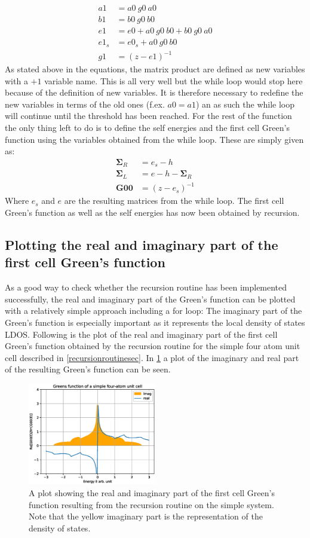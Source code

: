 \begin{align*}
a1 &= a0\ g0\ a0\\
b1 &= b0\ g0\ b0\\
e1 &= e0 + a0\ g0\ b0 + b0\ g0\ a0 \\
e1_{s} &= e0_{s} + a0\ g0\ b0 \\
g1 &= (z - e1)^{-1}
\end{align*}
As stated above in the equations, the matrix product are defined as new variables with a \(+1\) variable name. This is all very well but the while loop would stop here because of the definition of new variables. It is therefore necessary to redefine the new variables in terms of the old ones (f.ex. \(a0 = a1\)) an as such the while loop will continue until the threshold has been reached. For the rest of the function the only thing left to do is to define the self energies and the first cell Green's function using the variables obtained from the while loop. These are simply given as: 
\begin{align*}\label{\outputs}
    \mathbf{\Sigma}_R &= e_s - h \\
    \mathbf{\Sigma}_L &= e - h - \mathbf{\Sigma}_R \\
    \mathbf{G00} &= (z - e_s)^{-1}
\end{align*}
Where \(e_s\) and \(e\) are the resulting matrices from the while loop. The first cell Green's function as well as the self energies has now been obtained by recursion. 
\subsection{Plotting the real and imaginary part of the first cell Green's function}
As a good way to check whether the recursion routine has been implemented successfully, the real and imaginary part of the Green's function can be plotted with a relatively simple approach including a for loop:
The imaginary part of the Green's function is especially important as it represents the local density of states LDOS. Following is the plot of the real and imaginary part of the first cell Green's function obtained by the recursion routine for the simple four atom unit cell described in \cref{recursionroutinesec}. In \cref{imrealplot} a plot of the imaginary and real part of the resulting Green's function can be seen. 
\begin{figure}
    \centering
    \includegraphics[width = 0.5\textwidth]{Figures/imrealplot.eps}
    \caption{A plot showing the real and imaginary part of the first cell Green's function resulting from the recursion routine on the simple system. Note that the yellow imaginary part is the representation of the density of states.}
    \label{imrealplot}
\end{figure}
